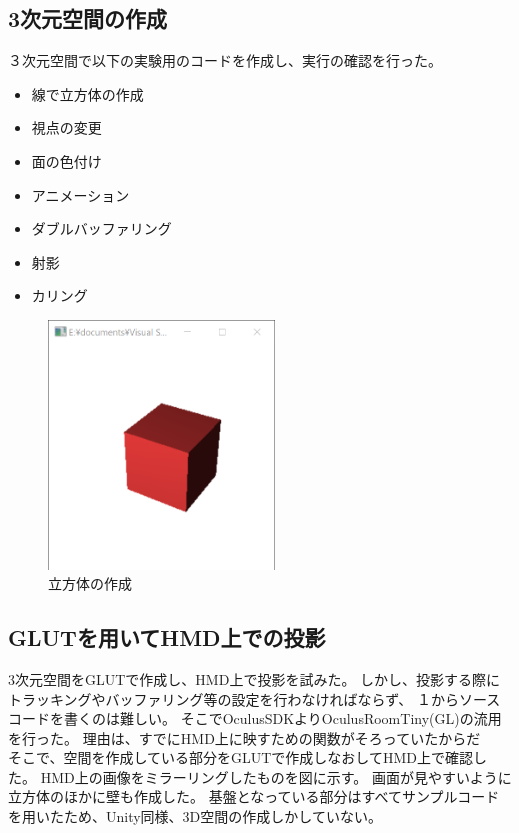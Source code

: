 \documentclass{jsarticle}
\begin{document}
\subsection{3次元空間の作成}
３次元空間で以下の実験用のコードを作成し、実行の確認を行った。
\begin{itemize}
  \item 線で立方体の作成
  \item 視点の変更
  \item 面の色付け
  \item アニメーション
  \item ダブルバッファリング
  \item 射影
  \item カリング
\end{itemize}

\begin{figure}[htbp]
  \centering
  \includegraphics[width=6cm]{3D_Cube.png}
  \caption{立方体の作成}
\end{figure}

\subsection{GLUTを用いてHMD上での投影}
3次元空間をGLUTで作成し、HMD上で投影を試みた。
しかし、投影する際にトラッキングやバッファリング等の設定を行わなければならず、
１からソースコードを書くのは難しい。
そこでOculusSDKよりOculusRoomTiny(GL)の流用を行った。
理由は、すでにHMD上に映すための関数がそろっていたからだ　
そこで、空間を作成している部分をGLUTで作成しなおしてHMD上で確認した。
HMD上の画像をミラーリングしたものを図に示す。
画面が見やすいように立方体のほかに壁も作成した。
基盤となっている部分はすべてサンプルコードを用いたため、Unity同様、3D空間の作成しかしていない。
\end{document}
